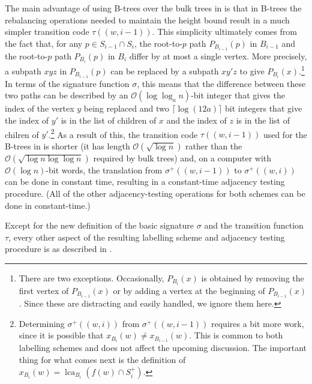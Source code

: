 \documentclass{patmorin}
\DeclareMathOperator{\lca}{lca}
\newcommand{\Oh}{\calO}
\newcommand{\calO}{\mathcal{O}}
\begin{document}
  The main advantage of using B-trees over the bulk trees in \cite{dujmovic.esperet.ea:adjacency} is that in B-trees the rebalancing operations needed to maintain the height bound result in a much simpler transition code $\tau((w,i-1))$.
  This simplicity ultimately comes from the fact that, for any $p\in S_{i-1}\cap S_i$, the root-to-$p$ path $P_{B_{i-1}}(p)$ in $B_{i-1}$ and the root-to-$p$ path $P_{B_i}(p)$ in $B_i$ differ by at most a single vertex.
  More precisely, a subpath $xyz$ in $P_{B_{i-1}}(p)$ can be replaced by a subpath $xy'z$ to give $P_{B_i}(x)$.\footnote{There are two exceptions.
  Occasionally, $P_{B_i}(x)$ is obtained by removing the first vertex of $P_{B_{i-1}}(x)$ or by adding a vertex at the beginning of $P_{B_{i-1}}(x)$.
  Since these are distracting and easily handled, we ignore them here.}  In terms of the signature function $\sigma$, this means that the difference between these two paths can be described by an $\Oh(\log\log_a n)$-bit integer that gives the index of the vertex $y$ being replaced and two $\lceil\log (12a)\rceil$ bit integers that give the index of $y'$ is in the list of children of $x$ and the index of $z$ is in the list of chilren of $y'$.\footnote{Determining $\sigma^+((w,i))$ from $\sigma^+((w,i-1))$ requires a bit more work, since it is possible that $x_{B_i}(w)\neq x_{B_{i-1}}(w)$.
  This is common to both labelling schemes and does not affect the upcoming discussion.
  The important thing for what comes next is the definition of $x_{B_i}(w)=\lca_{B_i}(f(w)\cap S^+_i)$.}  As a result of this, the transition code $\tau((w,i-1))$ used for the B-trees in \cite{gawrychowski.janczewski:simpler} is shorter (it has length $\Oh(\sqrt{\log n})$ rather than the $\Oh(\sqrt{\log n\log\log n})$ required by bulk trees) and, on a computer with $\Oh(\log n)$-bit words, the translation from $\sigma^+((w,i-1))$ to $\sigma^+((w,i))$ can be done in constant time, resulting in a constant-time adjacency testing procedure.
  (All of the other adjacency-testing operations for both schemes can be done in constant-time.)

  Except for the new definition of the basic signature $\sigma$ and the transition function $\tau$, every other aspect of the resulting labelling scheme and adjacency testing procedure is as described in \cite{dujmovic.esperet.ea:adjacency}.
\end{document}
